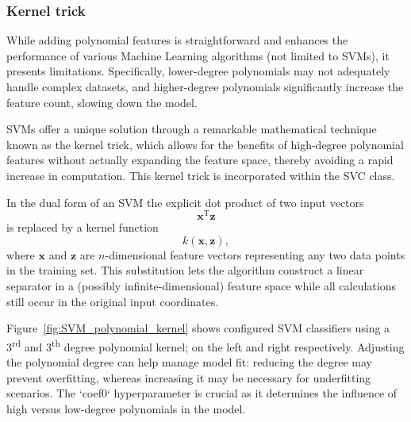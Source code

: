 \documentclass[12pt,letter]{article}
\begin{document}
\subsubsection{Kernel trick}

While adding polynomial features is straightforward and enhances the performance of various Machine Learning algorithms (not limited to SVMs), it presents limitations. Specifically, lower-degree polynomials may not adequately handle complex datasets, and higher-degree polynomials significantly increase the feature count, slowing down the model.

SVMs offer a unique solution through a remarkable mathematical technique known as the kernel trick, which allows for the benefits of high-degree polynomial features without actually expanding the feature space, thereby avoiding a rapid increase in computation. This kernel trick is incorporated within the SVC class. 

In the dual form of an SVM the explicit dot product of two input vectors  
\begin{equation}
\mathbf x^{\mathrm T}\mathbf z
\end{equation} 
is replaced by a kernel function  
\begin{equation}
k(\mathbf x,\mathbf z),
\end{equation}
where $\mathbf x$ and $\mathbf z$ are $n$-dimensional feature vectors representing any two data points in the training set.  
This substitution lets the algorithm construct a linear separator in a (possibly infinite-dimensional) feature space while all calculations still occur in the original input coordinates.



Figure~\ref{fig:SVM_polynomial_kernel} shows configured SVM classifiers using a 3\textsuperscript{rd} and 3\textsuperscript{th} degree polynomial kernel; on the left and right respectively. Adjusting the polynomial degree can help manage model fit: reducing the degree may prevent overfitting, whereas increasing it may be necessary for underfitting scenarios. The `coef0` hyperparameter is crucial as it determines the influence of high versus low-degree polynomials in the model.
\end{document}
